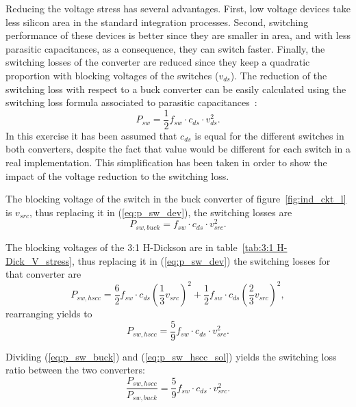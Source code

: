 Reducing the voltage stress has several advantages. First, low voltage devices take less silicon area in the standard integration processes. Second, switching performance of these devices is better since they are smaller in area, and with less parasitic capacitances, as a consequence, they can switch faster. Finally, the switching losses of the converter are reduced since they keep a quadratic proportion with blocking voltages of the switches ($v_{ds}$). The reduction of the switching loss with respect to a buck converter can be easily calculated using the switching loss formula associated to parasitic  capacitances~\cite{2001Erickson}:
\begin{equation}
P_{sw} = \frac{1}{2} f_{sw} \cdot c_{ds} \cdot v_{ds}^2.
\label{eq:p_sw_dev}
\end{equation}
In this exercise it has been assumed that $c_{ds}$ is equal for the different switches in both converters, despite the fact that value would be different for each switch in a real implementation. This simplification has been taken in order to show the impact of the voltage reduction to the switching loss. %

The blocking voltage of the switch in the buck converter of figure~\ref{fig:ind_ckt_l} is $v_{src}$, thus replacing it in (\ref{eq:p_sw_dev}), the switching losses are
\begin{equation}
P_{sw,buck} =   f_{sw} \cdot c_{ds} \cdot v_{src}^2.
\label{eq:p_sw_buck}
\end{equation}

The blocking voltages of the 3:1 H-Dickson are in table~\ref{tab:3:1 H-Dick_V_stress}, thus replacing it in (\ref{eq:p_sw_dev}) the switching losses for that converter are
\begin{equation}
P_{sw,hscc} =  \frac{6}{2}  f_{sw} \cdot c_{ds} \left( \frac{1}{3} v_{src} \right)^2 + \frac{1}{2}  f_{sw} \cdot c_{ds} \left( \frac{2}{3} v_{src} \right)^2 ,
\label{eq:p_sw_hscc}
\end{equation}
rearranging yields to
\begin{equation}
P_{sw,hscc} =  \frac{5}{9}  f_{sw} \cdot c_{ds} \cdot v_{src}^2.
\label{eq:p_sw_hscc_sol}
\end{equation}

Dividing (\ref{eq:p_sw_buck}) and (\ref{eq:p_sw_hscc_sol}) yields the switching loss ratio between the two converters:
\begin{equation}
\frac{P_{sw,hscc}}{P_{sw,buck}} =  \frac{5}{9}  f_{sw} \cdot c_{ds} \cdot v_{src}^2.
\label{eq:p_sw_hscc_sol}
\end{equation}


